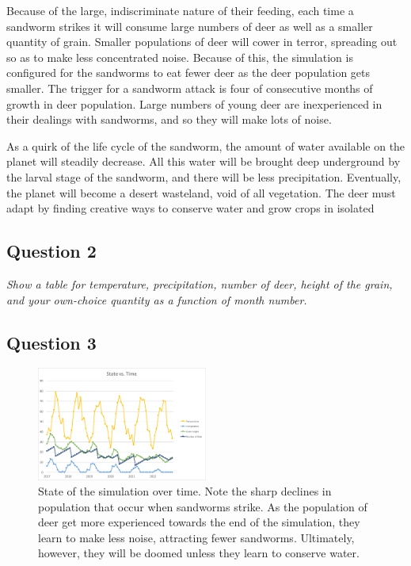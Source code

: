 \documentclass{article}
\begin{document}
Because of the large, indiscriminate nature of their feeding, each time a sandworm strikes it will consume large numbers of deer as well as a smaller quantity of grain.  Smaller populations of deer will cower in terror, spreading out so as to make less concentrated noise.  Because of this, the simulation is configured for the sandworms to eat fewer deer as the deer population gets smaller.  The trigger for a sandworm attack is four of consecutive months of growth in deer population.  Large numbers of young deer are inexperienced in their dealings with sandworms, and so they will make lots of noise.

As a quirk of the life cycle of the sandworm, the amount of water available on the planet will steadily decrease.  All this water will be brought deep underground by the larval stage of the sandworm, and there will be less precipitation.  Eventually, the planet will become a desert wasteland, void of all vegetation.  The deer must adapt by finding creative ways to conserve water and grow crops in isolated 

\subsection*{Question 2}
\textit{Show a table for temperature, precipitation, number of deer, height of the grain, and your own-choice quantity as a function of month number.}

\subsection*{Question 3}

\begin{figure}
        \begin{center}
        \includegraphics[width=0.5\textwidth]{Picture1.pdf}
        \end{center}
        \caption{State of the simulation over time.  Note the sharp declines in population that occur when sandworms strike.  As the population of deer get more experienced towards the end of the simulation, they learn to make less noise, attracting fewer sandworms.  Ultimately, however, they will be doomed unless they learn to conserve water.}
        \label{fig:State Plot}
\end{figure}
\end{document}
